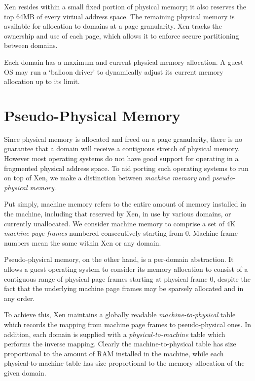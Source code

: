 \documentclass[11pt,twoside,final,openright]{report}
\begin{document}
Xen resides within a small fixed portion of physical memory; it also
reserves the top 64MB of every virtual address space. The remaining
physical memory is available for allocation to domains at a page
granularity.  Xen tracks the ownership and use of each page, which
allows it to enforce secure partitioning between domains.

Each domain has a maximum and current physical memory allocation. 
A guest OS may run a `balloon driver' to dynamically adjust its 
current memory allocation up to its limit. 



\section{Pseudo-Physical Memory}

Since physical memory is allocated and freed on a page granularity,
there is no guarantee that a domain will receive a contiguous stretch
of physical memory. However most operating systems do not have good
support for operating in a fragmented physical address space. To aid
porting such operating systems to run on top of Xen, we make a
distinction between \emph{machine memory} and \emph{pseudo-physical
memory}.

Put simply, machine memory refers to the entire amount of memory
installed in the machine, including that reserved by Xen, in use by
various domains, or currently unallocated. We consider machine memory
to comprise a set of 4K \emph{machine page frames} numbered
consecutively starting from 0. Machine frame numbers mean the same
within Xen or any domain.

Pseudo-physical memory, on the other hand, is a per-domain
abstraction. It allows a guest operating system to consider its memory
allocation to consist of a contiguous range of physical page frames
starting at physical frame 0, despite the fact that the underlying
machine page frames may be sparsely allocated and in any order.

To achieve this, Xen maintains a globally readable {\it
machine-to-physical} table which records the mapping from machine page
frames to pseudo-physical ones. In addition, each domain is supplied
with a {\it physical-to-machine} table which performs the inverse
mapping. Clearly the machine-to-physical table has size proportional
to the amount of RAM installed in the machine, while each
physical-to-machine table has size proportional to the memory
allocation of the given domain.
\end{document}
